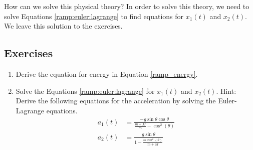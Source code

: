 \documentclass[book.tex]{subfiles}
\begin{document}
How can we solve this physical theory? In order to solve this theory, we need to solve Equations \ref{ramp:euler:lagrange} to find equations for $x_1(t)$ and $x_2(t)$. We leave this solution to the exercises.

\subsection{Exercises}
\begin{enumerate}

\item Derive the equation for energy in Equation \ref{ramp_energy}.
\item Solve the Equations \ref{ramp:euler:lagrange} for $x_1(t)$ and $x_2(t)$. Hint: Derive the following equations for the acceleration by solving the Euler-Lagrange equations.
\begin{align}
    a_1(t) &= \frac{-g \sin \theta \cos \theta}{\frac{m+M}{m} - \cos^2(\theta)} \\
    a_2(t) &= \frac{g \sin \theta}{1 - \frac{m\cos^2(\theta)}{m+M}}
\end{align}
\end{enumerate}
\end{document}

